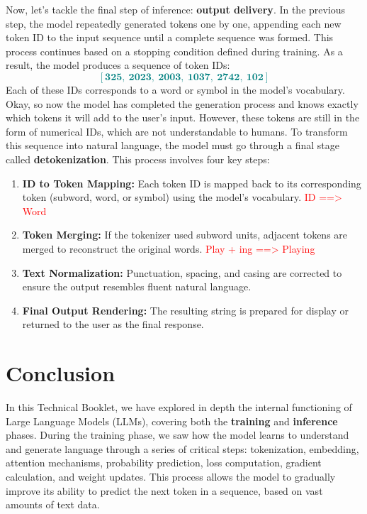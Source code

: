 \documentclass[12pt]{article}
\begin{document}
Now, let's tackle the final step of inference: \textbf{output delivery}. In the previous step, the model repeatedly generated tokens one by one, appending each new token ID to the input sequence until a complete sequence was formed. This process continues based on a stopping condition defined during training. As a result, the model produces a sequence of token IDs:
\textcolor{teal}{\large\[
[\textbf{325},\ \textbf{2023},\ \textbf{2003},\ \textbf{1037},\ \textbf{2742},\ \textbf{102}]
\]}
Each of these IDs corresponds to a word or symbol in the model's vocabulary.\\
\newpage
Okay, so now the model has completed the generation process and knows exactly which tokens it will add to the user's input. However, these tokens are still in the form of numerical IDs, which are not understandable to humans. To transform this sequence into natural language, the model must go through a final stage called \textbf{detokenization}. This process involves four key steps:
\begin{enumerate}
  \item \textbf{ID to Token Mapping:} Each token ID is mapped back to its corresponding token (subword, word, or symbol) using the model’s vocabulary. \textcolor{red}{ID ==> Word}
  \item \textbf{Token Merging:} If the tokenizer used subword units, adjacent tokens are merged to reconstruct the original words. \textcolor{red}{Play + ing ==> Playing}
  \item \textbf{Text Normalization:} Punctuation, spacing, and casing are corrected to ensure the output resembles fluent natural language.
  \item \textbf{Final Output Rendering:} The resulting string is prepared for display or returned to the user as the final response.
\end{enumerate}

\section{Conclusion}

In this Technical Booklet, we have explored in depth the internal functioning of Large Language Models (LLMs), covering both the \textbf{training} and \textbf{inference} phases. During the training phase, we saw how the model learns to understand and generate language through a series of critical steps: tokenization, embedding, attention mechanisms, probability prediction, loss computation, gradient calculation, and weight updates. This process allows the model to gradually improve its ability to predict the next token in a sequence, based on vast amounts of text data.
\end{document}
